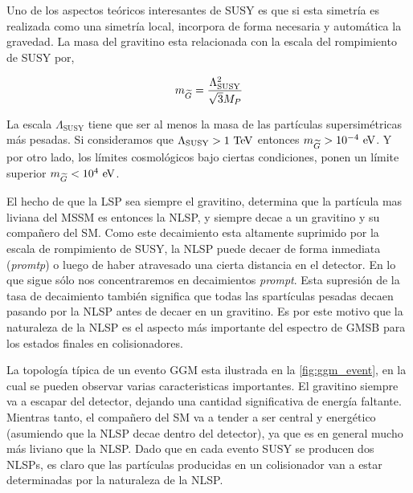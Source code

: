 Uno de los aspectos teóricos interesantes de SUSY es que si esta simetría es
realizada como una simetría local, incorpora de forma necesaria y automática la
gravedad.
La masa del gravitino esta relacionada con la escala del rompimiento de SUSY por,

\begin{equation}
  m_{\widetilde{G}} = \frac{\Lambda^2_{\text{SUSY}}}{\sqrt{3}M_P}
\end{equation}

La escala $\Lambda_{\text{SUSY}}$ tiene que ser al menos la masa de las
partículas supersimétricas más pesadas. Si consideramos que
$\Lambda_{\text{SUSY}} > 1 \tev$ entonces $m_{\gravino} > 10^{-4} \eV$.
Y por otro lado, los límites cosmológicos \cite{PhysRevLett.48.223,Moroi:1993mb}
bajo ciertas condiciones, ponen un límite superior $m_{\gravino} < 10^4 \eV$.%

El hecho de que la LSP sea siempre el gravitino, determina que la partícula mas
liviana del MSSM es entonces la NLSP, y siempre decae a un gravitino y su
compañero del SM. Como este decaimiento esta altamente suprimido por la escala
de rompimiento de SUSY, la NLSP puede decaer de forma inmediata (\emph{promtp}) o luego de haber
atravesado una cierta distancia en el detector. En lo que sigue sólo nos concentraremos
en decaimientos \emph{prompt}.
Esta supresión de la tasa de decaimiento también significa que todas las
spartículas pesadas decaen pasando por la NLSP antes de decaer en un gravitino.
Es por este motivo que la naturaleza de la NLSP es el aspecto más importante del
espectro de GMSB para los estados finales en colisionadores.


La topología típica de un evento GGM esta ilustrada en la
\cref{fig:ggm_event}, en la cual se pueden observar varias caracteristicas
importantes. El gravitino siempre va a escapar del detector, dejando una
cantidad significativa de energía faltante. Mientras tanto, el compañero del SM
va a tender a ser central y energético (asumiendo que la NLSP decae dentro del
detector), ya que es en general mucho más liviano que la NLSP. Dado que en cada
evento SUSY se producen dos NLSPs, es claro que las partículas producidas en un
colisionador van a estar determinadas por la naturaleza de la NLSP.

